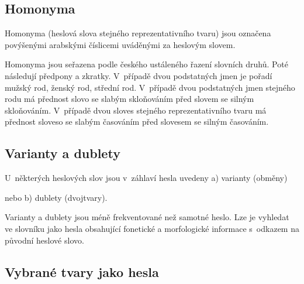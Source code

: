 \subsection*{Homonyma}

Homonyma (heslová slova stejného reprezentativního tvaru) jsou označena povýšenými arabskými číslicemi uváděnými za heslovým slovem.

\blspace
  \dicEntry {}  
  \dicEntry {}  
\blspace

Homonyma jsou seřazena podle českého ustáleného řazení slovních druhů. Poté následují předpony a zkratky.
V~případě dvou podstatných jmen je pořadí mužský rod, ženský rod, střední rod. V~případě dvou podstatných jmen stejného rodu má přednost slovo se slabým skloňováním před slovem se silným skloňováním. V~případě dvou sloves stejného reprezentativního tvaru má přednost sloveso se slabým časováním před slovesem se silným časováním.

\subsection*{Varianty a dublety}

U~některých heslových slov jsou v~záhlaví hesla uvedeny a) varianty (obměny)

\blspace
  \dicEntry {} 
\blspace

nebo b) dublety (dvojtvary).

\blspace
  \dicEntry {} 
\blspace

Varianty a dublety jsou méně frekventované než samotné heslo. Lze je vyhledat ve slovníku jako hesla obsahující fonetické a morfologické informace s~odkazem na původní heslové slovo.

\blspace
  \dicEntry {}    
  \dicEntry {}    
\blspace

\subsection*{Vybrané tvary jako hesla}

